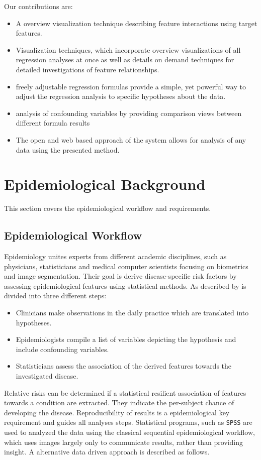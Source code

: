 \documentclass[journal]{style/vgtc} 			          %
\begin{document}
Our contributions are:
\begin{itemize}
	\item A overview visualization technique describing feature interactions using target features.
	\item Visualization techniques, which incorporate overview visualizations of all regression analyses at once as well as details on demand techniques for detailed investigations of feature relationships.
	\item freely adjustable regression formulas provide a simple, yet powerful way to adjust the regression analysis to specific hypotheses about the data.
	\item analysis of confounding variables by providing comparison views between different formula results
	\item The open and web based approach of the system allows for analysis of any data using the presented method.
\end{itemize}

\section{Epidemiological Background} \label{MedicalAndTechnicalBackground}
This section covers the epidemiological workflow and requirements.
\subsection{Epidemiological Workflow} \label{EpidemiologicalWorkflow}
Epidemiology unites experts from different academic disciplines, such as physicians, statisticians and medical computer scientists focusing on biometrics and image segmentation.
Their goal is derive disease-specific risk factors by assessing epidemiological features using statistical methods.
As described by \cite{Thew2009} is divided into three different steps:
\begin{itemize}
	\item Clinicians make observations in the daily practice which are translated into hypotheses.
	\item Epidemiologists compile a list of variables depicting the hypothesis and include confounding variables.
	\item Statisticians assess the association of the derived features towards the investigated disease.
\end{itemize}
Relative risks can be determined if a statistical resilient association of features towards a condition are extracted.
They indicate the per-subject chance of developing the disease.
Reproducibility of results is a epidemiological key requirement and guides all analyses steps.
Statistical programs, such as \texttt{SPSS} are used to analyzed the data using the classical sequential epidemiological workflow, which uses images largely only to communicate results, rather than providing insight.
A alternative data driven approach is described as follows.
\end{document}
